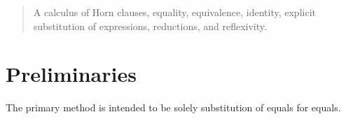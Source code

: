 


\begin{abstract}
A calculus of Horn clauses, equality, equivalence, identity, explicit substitution of expressions, reductions, and reflexivity.
\end{abstract}

\part{Preliminaries}
\begin{center}
	\begin{flushleft}
		The primary method is intended to be solely substitution of equals for equals.
	\end{flushleft}

	
\end{center}

\newpage
